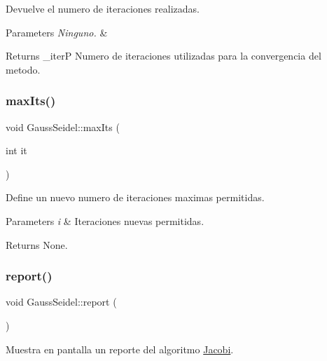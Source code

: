 Devuelve el numero de iteraciones realizadas. 


\begin{DoxyParams}{Parameters}
{\em Ninguno.} & \\
\hline
\end{DoxyParams}
\begin{DoxyReturn}{Returns}
\+\_\+iterP Numero de iteraciones utilizadas para la convergencia del metodo. 
\end{DoxyReturn}
\hypertarget{class_gauss_seidel_aa52a83ac794ad85dcfbff4782a2a4f1d}{}\label{class_gauss_seidel_aa52a83ac794ad85dcfbff4782a2a4f1d} 
\subsubsection{\texorpdfstring{max\+Its()}{maxIts()}}
{\footnotesize\ttfamily void Gauss\+Seidel\+::max\+Its (\begin{DoxyParamCaption}\item[{int}]{it }\end{DoxyParamCaption})\hspace{0.3cm}{\ttfamily [inline]}}



Define un nuevo numero de iteraciones maximas permitidas. 


\begin{DoxyParams}{Parameters}
{\em i} & Iteraciones nuevas permitidas. \\
\hline
\end{DoxyParams}
\begin{DoxyReturn}{Returns}
None. 
\end{DoxyReturn}
\hypertarget{class_gauss_seidel_acfa57a8a814d10c304f83144ed87b442}{}\label{class_gauss_seidel_acfa57a8a814d10c304f83144ed87b442} 
\subsubsection{\texorpdfstring{report()}{report()}}
{\footnotesize\ttfamily void Gauss\+Seidel\+::report (\begin{DoxyParamCaption}{ }\end{DoxyParamCaption})\hspace{0.3cm}{\ttfamily [inline]}}



Muestra en pantalla un reporte del algoritmo \hyperlink{class_jacobi}{Jacobi}. 


